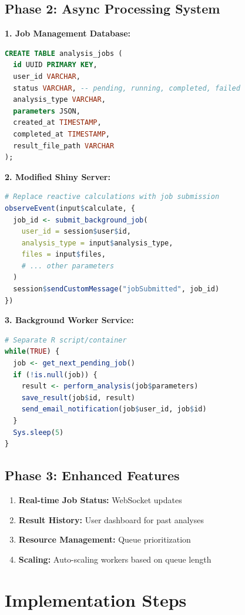 \documentclass{article}
\begin{document}
\subsection{Phase 2: Async Processing System}

\textbf{1. Job Management Database:}
\begin{lstlisting}[language=SQL]
CREATE TABLE analysis_jobs (
  id UUID PRIMARY KEY,
  user_id VARCHAR,
  status VARCHAR, -- pending, running, completed, failed
  analysis_type VARCHAR,
  parameters JSON,
  created_at TIMESTAMP,
  completed_at TIMESTAMP,
  result_file_path VARCHAR
);
\end{lstlisting}

\textbf{2. Modified Shiny Server:}
\begin{lstlisting}[language=R]
# Replace reactive calculations with job submission
observeEvent(input$calculate, {
  job_id <- submit_background_job(
    user_id = session$user$id,
    analysis_type = input$analysis_type,
    files = input$files,
    # ... other parameters
  )
  session$sendCustomMessage("jobSubmitted", job_id)
})
\end{lstlisting}

\textbf{3. Background Worker Service:}
\begin{lstlisting}[language=R]
# Separate R script/container
while(TRUE) {
  job <- get_next_pending_job()
  if (!is.null(job)) {
    result <- perform_analysis(job$parameters)
    save_result(job$id, result)
    send_email_notification(job$user_id, job$id)
  }
  Sys.sleep(5)
}
\end{lstlisting}

\subsection{Phase 3: Enhanced Features}
\begin{enumerate}
\item \textbf{Real-time Job Status:} WebSocket updates
\item \textbf{Result History:} User dashboard for past analyses
\item \textbf{Resource Management:} Queue prioritization
\item \textbf{Scaling:} Auto-scaling workers based on queue length
\end{enumerate}

\section{Implementation Steps}
\end{document}
